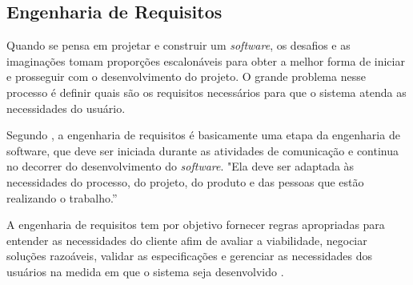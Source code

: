 \subsection{Engenharia de Requisitos}

Quando se pensa em projetar e construir um \textit{software}, os desafios e as imaginações tomam proporções escalonáveis para obter a melhor forma de iniciar e prosseguir com o desenvolvimento do projeto. O grande problema nesse processo é definir quais são os requisitos necessários para que o sistema atenda as necessidades do usuário.

Segundo , a engenharia de requisitos é basicamente uma etapa da engenharia de software, que deve ser iniciada durante as atividades de comunicação e continua no decorrer do desenvolvimento do \textit{software}. "Ela deve ser adaptada às necessidades do processo, do projeto, do produto e das pessoas que estão realizando o trabalho.”

A engenharia de requisitos tem por objetivo fornecer regras apropriadas para entender as necessidades do cliente afim de avaliar a viabilidade, negociar soluções razoáveis, validar as especificações e gerenciar as necessidades dos usuários na medida em que o sistema seja desenvolvido \cite{PRESSMAN2016}.